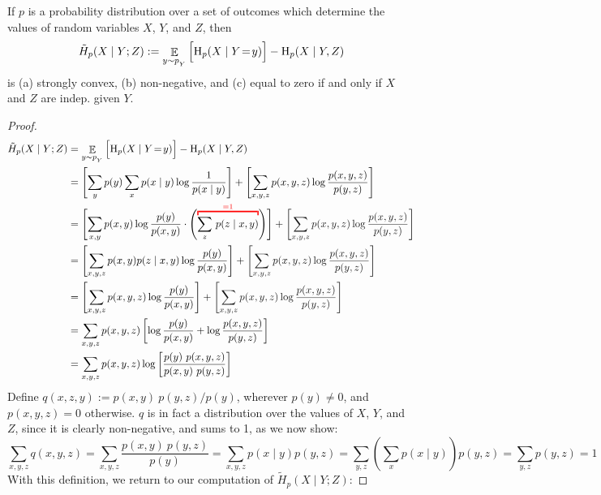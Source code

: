\documentclass{article}
\begin{document}
\begin{lemma} \label{lem:bnmaxent-component}
	If $p$ is a probability distribution over a set of outcomes which determine the values of random variables $X$, $Y$, and $Z$, then 
	\[ \tilde H_p(X \mid Y; Z) := \mathop{\mathbb E}_{y \sim p_{_{Y}}} \Big[ \mathrm{H}_p(X \mid Y \!=\!y) \Big]  - \mathrm{H}_p( X \mid Y, Z)\]
	is (a) strongly convex, (b) non-negative, and (c) equal to zero if and only if $X$ and $Z$ are indep. given $Y$.
\end{lemma}
\begin{proof}
	\begin{align*}
		\tilde H_p(X \mid Y; Z) &= \E_{y \sim p_{_{Y}}}  \Big[ \H_p(X \mid Y \!=\!y)\Big] - \H_p( X \mid Y, Z)  \\
			&=  \left[\sum_{y} p(y) \sum_x  p(x\mid y) \log \frac{1}{p(x \mid y)} \right]+ \left[\sum_{x,y, z} p(x, y, z) \log \frac{p(x,y,z)}{p(y, z)}\right] \\[0.5em]
		&= \left[\sum_{x,y} p(x,y) \log \frac{p(y)}{p(x,y)} \cdot 
				\left( {\color{red} \vphantom{\sum_{z}}\smash{\overbracket{\color{black}{\sum_{z}}~p(z \mid x, y)}^{=1}}}\right)
			\right] + {\color{inactive}\left[\sum_{x,y, z} p(x, y, z) \log \frac{p(x,y,z)}{p(y, z)} \right]} \\
		&= \left[\sum_{x,y, z} p(x,y) p(z \mid x, y) \log \frac{p(y)}{p(x,y)} \right] + {\color{inactive}\left[\sum_{x,y, z} p(x, y, z) \log \frac{p(x,y,z)}{p(y, z)} \right]} \\
		&= \left[\sum_{x,y, z} p(x,y ,z) \log \frac{p(y)}{p(x,y)}
			\right] + {\color{inactive}\left[\sum_{x,y, z} p(x, y, z) \log \frac{p(x,y,z)}{p(y, z)} \right]} \\
		&= \sum_{x,y, z} p(x,y ,z) \left[ \log \frac{p(y)}{p(x,y)} + \log \frac{p(x,y,z)}{p(y, z)} \right] \\
		&= \sum_{x,y, z}  p(x,y ,z) \log \left[\frac{p(y)\ p(x,y,z)}{p(x,y)\ p(y,z)} \right]  \\
	\end{align*}
	Define $q(x,z,y) := {p(x,y)\ p(y,z) }/{p(y)}$, wherever $p(y)\neq 0$, and $p(x,y,z) = 0$ otherwise. $q$ is in fact a distribution over the values of $X$, $Y$, and $Z$, since it 
	is clearly non-negative, and sums to 1, as we now show:
	\[
	 \sum_{x,y,z} q(x,y, z) = \sum_{x,y,z} \frac{p(x,y)\ p(y,z)}{p(y)}
		= \sum_{x,y,z} p(x \mid y) p(y,z)
		= \sum_{y,z} \left(\sum_x p(x \mid y)\right) p(y,z)
		= \sum_{y,z}  p(y,z)
		= 1
	\]	
		With this definition, we return to our computation of $\tilde H_p(X \mid Y; Z)$:

\end{proof}
\end{document}
